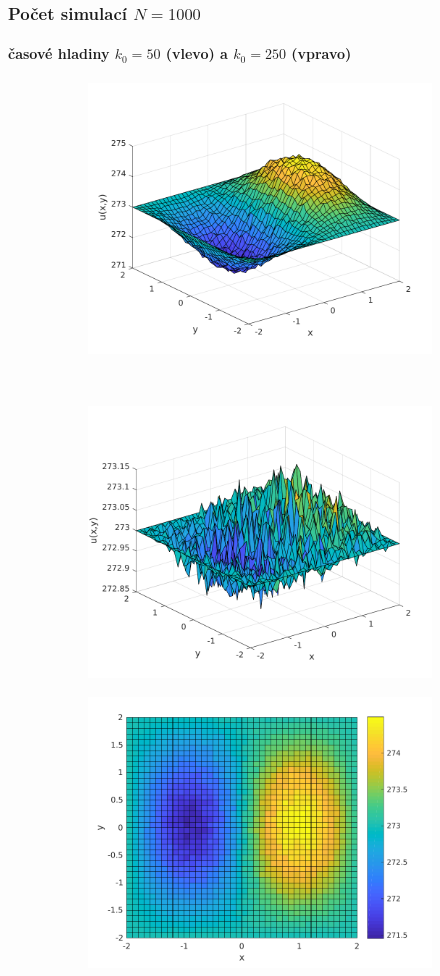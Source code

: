 \begin{frame}\frametitle{Počet simulací $N=1000$}
\framesubtitle{časové hladiny $k_{0}=50$ (vlevo) a $k_{0}=250$ (vpravo)}
\begin{figure}
    \centering
    \begin{subfigure}[t]{0.5\textwidth}
        \centering
        \includegraphics[width=0.75\linewidth]{../../results/simulations/1000/solution_3D/solution_3D_sim1000_step01_time50_boundary2.pdf}
    \end{subfigure}%
    ~ 
    \begin{subfigure}[t]{0.5\textwidth}
        \centering
        \includegraphics[width=0.75\linewidth]{../../results/simulations/1000/solution_3D/solution_3D_sim1000_step01_time250_boundary2.pdf}
    \end{subfigure}
    \begin{subfigure}[t]{0.5\textwidth}
        \centering
        \includegraphics[width=0.70\linewidth]{../../results/simulations/1000/solution_2D/solution_2D_sim1000_step01_time50_boundary2.pdf}

\end{subfigure}
\end{figure}
\end{frame}
